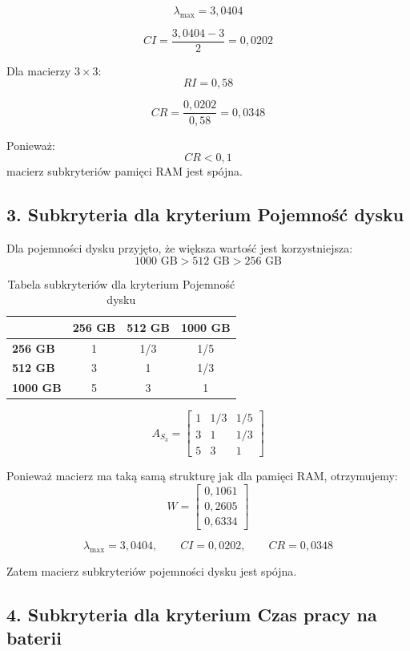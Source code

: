 \documentclass[12pt,a4paper]{article}
\begin{document}
\[
\lambda_{\max}=3{,}0404
\]

\[
CI=\frac{3{,}0404-3}{2}=0{,}0202
\]

Dla macierzy \(3\times 3\):
\[
RI=0{,}58
\]

\[
CR=\frac{0{,}0202}{0{,}58}=0{,}0348
\]

Ponieważ:
\[
CR<0{,}1
\]
macierz subkryteriów pamięci RAM jest spójna.

\subsection*{3. Subkryteria dla kryterium Pojemność dysku}

Dla pojemności dysku przyjęto, że większa wartość jest korzystniejsza:
\[
1000\text{ GB} > 512\text{ GB} > 256\text{ GB}
\]

\begin{table}[H]
\centering
\caption{Tabela subkryteriów dla kryterium Pojemność dysku}
\begin{tabular}{lccc}
\toprule
 & \textbf{256 GB} & \textbf{512 GB} & \textbf{1000 GB} \\
\midrule
\textbf{256 GB} & 1 & 1/3 & 1/5 \\
\textbf{512 GB} & 3 & 1 & 1/3 \\
\textbf{1000 GB} & 5 & 3 & 1 \\
\bottomrule
\end{tabular}
\end{table}

\[
A_{S_3}=
\begin{bmatrix}
1 & 1/3 & 1/5 \\
3 & 1 & 1/3 \\
5 & 3 & 1
\end{bmatrix}
\]

Ponieważ macierz ma taką samą strukturę jak dla pamięci RAM, otrzymujemy:
\[
W=
\begin{bmatrix}
0{,}1061\\
0{,}2605\\
0{,}6334
\end{bmatrix}
\]

\[
\lambda_{\max}=3{,}0404,\qquad
CI=0{,}0202,\qquad
CR=0{,}0348
\]

Zatem macierz subkryteriów pojemności dysku jest spójna.

\subsection*{4. Subkryteria dla kryterium Czas pracy na baterii}
\end{document}
